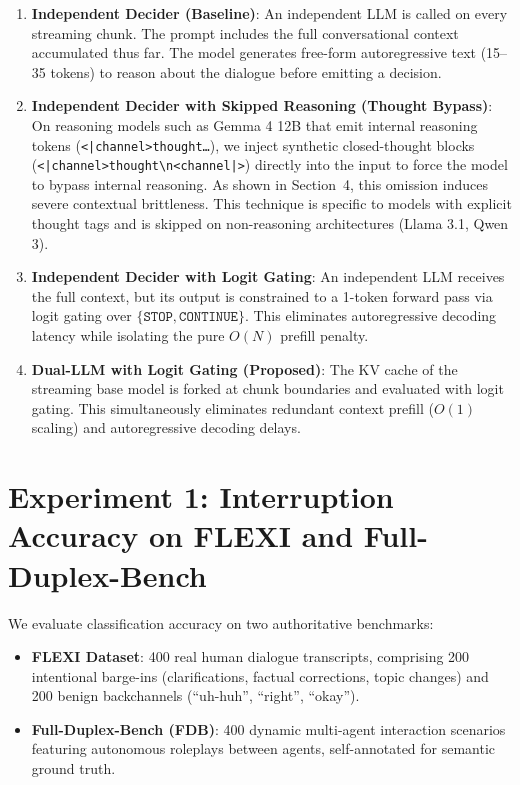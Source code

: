 \documentclass{article}
\begin{document}
\begin{enumerate}
    \item[\textbf{A.}] \textbf{Independent Decider (Baseline)}: An independent LLM is called on every streaming chunk. The prompt includes the full conversational context accumulated thus far. The model generates free-form autoregressive text (15--35 tokens) to reason about the dialogue before emitting a decision.
    \item[\textbf{B.}] \textbf{Independent Decider with Skipped Reasoning (Thought Bypass)}: On reasoning models such as Gemma 4 12B that emit internal reasoning tokens (\texttt{<|channel>thought\dots}), we inject synthetic closed-thought blocks (\texttt{<|channel>thought\textbackslash n<channel|>}) directly into the input to force the model to bypass internal reasoning. As shown in Section~4, this omission induces severe contextual brittleness. This technique is specific to models with explicit thought tags and is skipped on non-reasoning architectures (Llama 3.1, Qwen 3).
    \item[\textbf{C.}] \textbf{Independent Decider with Logit Gating}: An independent LLM receives the full context, but its output is constrained to a 1-token forward pass via logit gating over $\{\texttt{STOP}, \texttt{CONTINUE}\}$. This eliminates autoregressive decoding latency while isolating the pure $O(N)$ prefill penalty.
    \item[\textbf{D.}] \textbf{Dual-LLM with Logit Gating (Proposed)}: The KV cache of the streaming base model is forked at chunk boundaries and evaluated with logit gating. This simultaneously eliminates redundant context prefill ($O(1)$ scaling) and autoregressive decoding delays.
\end{enumerate}

\section{Experiment 1: Interruption Accuracy on FLEXI and Full-Duplex-Bench}

We evaluate classification accuracy on two authoritative benchmarks:
\begin{itemize}
    \item \textbf{FLEXI Dataset}: 400 real human dialogue transcripts, comprising 200 intentional barge-ins (clarifications, factual corrections, topic changes) and 200 benign backchannels (``uh-huh'', ``right'', ``okay'').
    \item \textbf{Full-Duplex-Bench (FDB)}: 400 dynamic multi-agent interaction scenarios featuring autonomous roleplays between agents, self-annotated for semantic ground truth.
\end{itemize}
\end{document}
